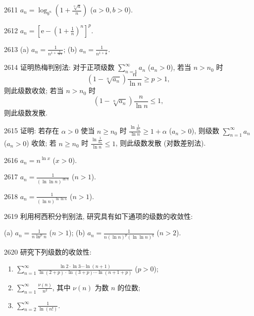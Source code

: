\begin{prob}[S]{2611}
$a_n = \log_{b^n} \left(1 + \frac{\sqrt[n]{a}}{n}\right)$ ($a > 0, b > 0$).
\end{prob}

\begin{prob}[S]{2612}
$a_n = \left[\mathrm{e} - \left(1 + \frac{1}{n}\right)^n\right]^p$.
\end{prob}

\begin{prob}[M]{2613}
(a) $a_n = \frac{1}{n^{1+\frac{k}{\ln n}}}$; \qquad (b) $a_n = \frac{1}{n^{1+\frac{1}{n}}}$.
\end{prob}

\begin{prob}[M]{2614}
证明热梅判别法: 对于正项级数 $\sum_{n=1}^{\infty} a_n$ ($a_n > 0$), 若当 $n > n_0$ 时
\[
(1 - \sqrt[n]{a_n}) \frac{n}{\ln n} \geqslant p > 1,
\]
则此级数收敛; 若当 $n > n_0$ 时
\[
(1 - \sqrt[n]{a_n}) \frac{n}{\ln n} \leqslant 1,
\]
则此级数发散.
\end{prob}

\begin{prob}[M]{2615}
证明: 若存在 $\alpha > 0$ 使当 $n \geqslant n_0$ 时 $\frac{\ln \frac{1}{a_n}}{\ln n} \geqslant 1 + \alpha$ ($a_n > 0$), 则级数 $\sum_{n=1}^{\infty} a_n$ ($a_n > 0$) 收敛; 若 $n \geqslant n_0$ 时 $\frac{\ln \frac{1}{a_n}}{\ln n} \leqslant 1$, 则此级数发散 (对数差别法).
\end{prob}


\begin{prob}[S]{2616}
$a_n = n^{\ln x}$ ($x > 0$).
\end{prob}

\begin{prob}[S]{2617}
$a_n = \frac{1}{(\ln \ln n)^{\ln n}}$ ($n > 1$).
\end{prob}

\begin{prob}[S]{2618}
$a_n = \frac{1}{(\ln n)^{\ln \ln n}}$ ($n > 1$).
\end{prob}

\begin{prob}[M]{2619}
利用柯西积分判别法, 研究具有如下通项的级数的收敛性:

(a) $a_n = \frac{1}{n \ln^p n}$ ($n > 1$); \qquad (b) $a_n = \frac{1}{n (\ln n)^p (\ln \ln n)^q}$ ($n > 2$).
\end{prob}

\begin{prob}[L]{2620}
研究下列级数的收敛性:
\begin{enumerate}[label=(\alph*), itemsep=2pt, topsep=3pt]
\item $\sum_{n=1}^{\infty} \frac{\ln 2 \cdot \ln 3 \cdots \ln(n+1)}{\ln(2+p) \cdot \ln(3+p) \cdots \ln(n+1+p)}$ ($p > 0$);
\item $\sum_{n=1}^{\infty} \frac{\nu(n)}{n^2}$, 其中 $\nu(n)$ 为数 $n$ 的位数;
\item $\sum_{n=2}^{\infty} \frac{1}{\ln(n!)}$.
\end{enumerate}
\end{prob}

